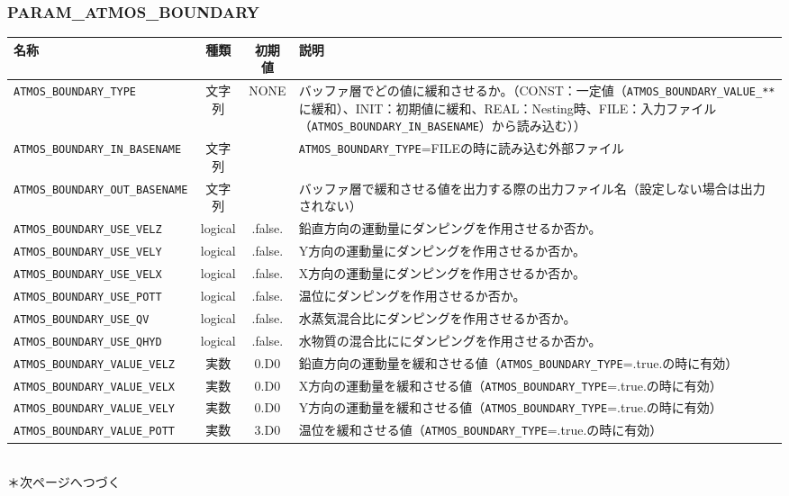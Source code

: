 \subsubsection{PARAM\_ATMOS\_BOUNDARY}
\begin{tabularx}{150mm}{|l|c|c|X|} \hline
 \rowcolor[gray]{0.9} 名称 & 種類 & 初期値 & 説明 \\ \hline
 \verb|ATMOS_BOUNDARY_TYPE| & 文字列 & NONE & バッファ層でどの値に緩和させるか。（CONST：一定値（\verb|ATMOS_BOUNDARY_VALUE_**|に緩和）、INIT：初期値に緩和、REAL：Nesting時、FILE：入力ファイル（\verb|ATMOS_BOUNDARY_IN_BASENAME|）から読み込む）） \\ \hline
 \verb|ATMOS_BOUNDARY_IN_BASENAME| & 文字列 &  & \verb|ATMOS_BOUNDARY_TYPE|=FILEの時に読み込む外部ファイル  \\ \hline
 \verb|ATMOS_BOUNDARY_OUT_BASENAME| & 文字列 &  & バッファ層で緩和させる値を出力する際の出力ファイル名（設定しない場合は出力されない） \\ \hline
 \verb|ATMOS_BOUNDARY_USE_VELZ| & logical & .false. &  鉛直方向の運動量にダンピングを作用させるか否か。 \\ \hline
 \verb|ATMOS_BOUNDARY_USE_VELY| & logical & .false. &  Y方向の運動量にダンピングを作用させるか否か。 \\ \hline
 \verb|ATMOS_BOUNDARY_USE_VELX| & logical & .false. &  X方向の運動量にダンピングを作用させるか否か。 \\ \hline
 \verb|ATMOS_BOUNDARY_USE_POTT| & logical & .false. &  温位にダンピングを作用させるか否か。 \\ \hline
 \verb|ATMOS_BOUNDARY_USE_QV| & logical & .false. &  水蒸気混合比にダンピングを作用させるか否か。 \\ \hline
 \verb|ATMOS_BOUNDARY_USE_QHYD| & logical & .false. &  水物質の混合比ににダンピングを作用させるか否か。 \\ \hline
 \verb|ATMOS_BOUNDARY_VALUE_VELZ| & 実数 & 0.D0 & 鉛直方向の運動量を緩和させる値（\verb|ATMOS_BOUNDARY_TYPE|=.true.の時に有効） \\ \hline
 \verb|ATMOS_BOUNDARY_VALUE_VELX| & 実数 & 0.D0 & X方向の運動量を緩和させる値（\verb|ATMOS_BOUNDARY_TYPE|=.true.の時に有効） \\ \hline
 \verb|ATMOS_BOUNDARY_VALUE_VELY| & 実数 & 0.D0 & Y方向の運動量を緩和させる値（\verb|ATMOS_BOUNDARY_TYPE|=.true.の時に有効） \\ \hline
 \verb|ATMOS_BOUNDARY_VALUE_POTT| & 実数 & 3.D0 & 温位を緩和させる値（\verb|ATMOS_BOUNDARY_TYPE|=.true.の時に有効） \\ \hline
\end{tabularx}
　\\
\indent ＊次ページへつづく

